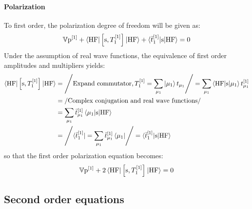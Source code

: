 \paragraph*{Polarization}
To first order, the polarization degree of freedom will be given as:
\begin{equation}%
  \V\p^{[1]} + \braket{\mathrm{HF} | \commutator{\s}{T_1^{[1]}}| \mathrm{HF}}
  + \braket{\tbar{1}^{[1]} | \s | \mathrm{HF} } = 0
\end{equation}
Under the assumption of real wave functions, the equivalence of
first order amplitudes and multipliers yields:
\begin{equation}
  \begin{aligned}
  \braket{\mathrm{HF} | \left[ \mathrm{s}, T_1^{[1]} \right]^{}| \mathrm{HF}}
  &= \left/ \text{Expand commutator}, T_1^{[1]} = \sum_{\mu_1}\ket{\mu_1}t_{\mu_1} \right/
  =
  \sum_{\mu_1}\braket{\mathrm{HF}|\mathrm{s}|\mu_1}t_{\mu_1}^{[1]} \\
  &= \left/ \text{Complex conjugation and real wave functions} \right/ \\
  &= \sum_{\mu_1}\bar{t}_{\mu_1}^{[1]}\braket{\mu_1 | \mathrm{s} | \mathrm{HF}} \\
  &= \left/
  \bra{\bar{t}_{1}^{[1]}} = \sum_{\mu_1}\bar{t}_{\mu_1}^{[1]}\bra{\mu_1} \right/
  = \braket{\bar{t}_{1}^{[1]} | \mathrm{s} | \mathrm{HF}}
 \end{aligned}
\end{equation}
so that the first order polarization equation becomes:
\begin{equation}\label{eq:1st-order-pol}
  \mathbb{V}\mathrm{p}^{[1]} + 2\braket{\mathrm{HF} | \left[ \mathrm{s}, T_1^{[1]} \right]^{}| \mathrm{HF}} = 0
\end{equation}

\subsection{Second order equations}\label{sec:second-order-pt}

